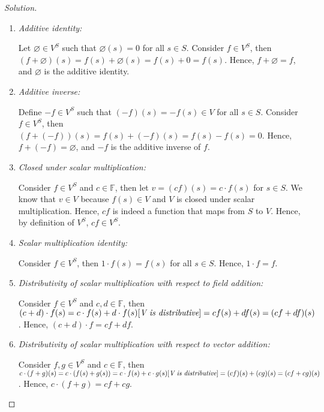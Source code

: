 \documentclass{article}
\begin{document}
\begin{proof}[Solution]
\begin{enumerate}
        \item \emph{Additive identity:}
        
        Let $\varnothing \in V^S$ such that $\varnothing(s) = 0$ for all 
        $s \in S$. Consider $f \in V^S$, then $(f + \varnothing)(s) = f(s) + \varnothing(s) = f(s) 
        + 0 = f(s)$. Hence, $f + \varnothing = f$, and $\varnothing$ is the additive identity.

        \item \emph{Additive inverse:}
        
        Define $-f \in V^S$ such that $(-f)(s) = -f(s) \in V$ for all $s \in S$. Consider $f \in V^S$, 
        then $(f + (-f))(s) = f(s) + (-f)(s) = f(s) - f(s) = 0$. Hence, $f + (-f) = \varnothing$,
        and $-f$ is the additive inverse of $f$.

        \item \emph{Closed under scalar multiplication:}
        
        Consider $f \in V^S$ and $c \in \mathbb{F}$, then let $v = (cf)(s) = c \cdot f(s)$ for 
        $s \in S$. We know that $v \in V$ because $f(s) \in V$ and $V$ is closed under scalar 
        multiplication. Hence, $cf$ is indeed a function that maps from $S$ to $V$. Hence, by 
        definition of $V^S$, $cf \in V^S$. 

        \item \emph{Scalar multiplication identity:}
        
        Consider $f \in V^S$, then $1\cdot f(s) = f(s)$ for all $s \in S$. Hence, $1\cdot f = f$.

        \item \emph{Distributivity of scalar multiplication with respect to field addition:}
        
        Consider $f \in V^S$ and $c, d \in \mathbb{F}$, then $(c + d)\cdot f(s) = c\cdot f(s)
        + d\cdot f(s) [\emph{V is distributive}] = cf(s) + df(s) = (cf + df)(s)$. Hence, 
        $(c + d)\cdot f = cf + df$.
        
        \item \emph{Distributivity of scalar multiplication with respect to vector addition:}
        
        Consider $f, g \in V^S$ and $c \in \mathbb{F}$, then $c\cdot(f + g)(s) = c\cdot (f(s)
        + g(s)) = c\cdot f(s) + c\cdot g(s) [\emph{V is distributive}] = (cf)(s) + (cg)(s) = 
        (cf + cg)(s)$. Hence, $c\cdot(f + g) = cf + cg$.
    \end{enumerate}
\end{proof}
\end{document}

